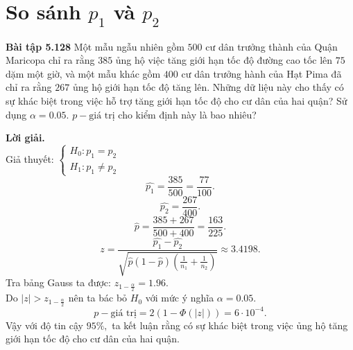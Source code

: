 \section{So sánh $p_1$ và $p_2$}
\begin{mybox}
\textbf{Bài tập 5.128} Một mẫu ngẫu nhiên gồm $500$ cư dân trưởng thành của Quận Maricopa chỉ ra rằng $385$ ủng hộ việc tăng giới hạn tốc độ đường cao tốc lên $75$ dặm một giờ, và một mẫu khác gồm $400$ cư dân trưởng hành của Hạt Pima đã chỉ ra rằng $267$ ủng hộ giới hạn tốc độ tăng lên. Những dữ liệu này cho thấy có sự khác biệt trong việc hỗ trợ tăng giới hạn tốc độ cho cư dân của hai quận? Sử dụng $\alpha = 0.05.$ $p-\text{giá trị}$ cho kiểm định này là bao nhiêu?
\end{mybox}
\textbf{Lời giải.}\\
Giả thuyết: $\begin{cases}
H_0: p_1 = p_2\\
H_1: p_1 \ne p_2
\end{cases}$\\
$$\widehat{p_1} = \frac{385}{500} = \frac{77}{100}.$$
$$\widehat{p_2} = \frac{267}{400}.$$
$$\widehat{p} = \frac{385 + 267}{500 + 400} = \frac{163}{225}.$$
$$z = \frac{{\widehat {{p_1}} - \widehat {{p_2}}}}{{\sqrt {\widehat p\left( {1 - \widehat p} \right)\left( {\frac{1}{{{n_1}}} + \frac{1}{{{n_2}}}} \right)} }} \approx 3.4198.$$
Tra bảng Gauss ta được: $z_{1 - \frac{\alpha}{2}} = 1.96.$\\
Do $\left| z \right| > z_{1 - \frac{\alpha}{2}}$ nên ta bác bỏ $H_0$ với mức ý nghĩa $\alpha = 0.05.$
$$p-\text{giá trị} = 2 \left( {1 - \Phi \left( {\left| z \right|} \right)} \right) = 6 \cdot 10^{-4}.$$
Vậy với độ tin cậy $95\%,$ ta kết luận rằng có sự khác biệt trong việc ủng hộ tăng giới hạn tốc độ cho cư dân của hai quận.

